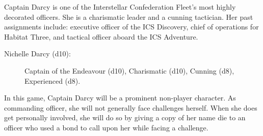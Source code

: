 \documentclass[11pt, a5paper, parskip=half-, DIV=12]{scrartcl}
\begin{document}
Captain Darcy is one of the Interstellar Confederation Fleet's most highly decorated officers. She is a charismatic leader and a cunning tactician. Her past assignments include: executive officer of the ICS Discovery, chief of operations for Habitat Three, and tactical officer aboard the ICS Adventure.

\begin{description}
	\item[Nichelle Darcy (d10):] Captain of the Endeavour (d10), Charismatic (d10), Cunning (d8), Experienced (d8).
\end{description}

In this game, Captain Darcy will be a prominent non-player character. As commanding officer, she will not generally face challenges herself. When she does get personally involved, she will do so by giving a copy of her name die to an officer who used a bond to call upon her while facing a challenge.

\newpage

\ClearShipoutPicture
\end{document}
